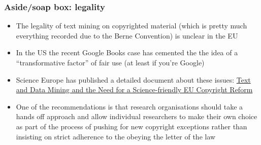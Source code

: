 \documentclass{beamer}
\begin{document}
\begin{frame}
\frametitle{Aside/soap box: legality}

\begin{itemize}
  \item The legality of text mining on copyrighted material (which is pretty
    much everything recorded due to the Berne Convention) is unclear in the
    EU\pause{}
  \item In the US the recent Google Books case has cemented the the idea of a
    ``transformative factor'' of fair use (at least if you're Google)\pause{}
  \item Science Europe has published a detailed document about these issues:
    \href{http://www.scienceeurope.org/uploads/PublicDocumentsAndSpeeches/WGs_docs/SE_Briefing_Paper_textand_Data_web.pdf}%
    {Text and Data Mining and the Need for a Science-friendly EU Copyright Reform}\pause{}
  \item One of the recommendations is that research organisations should take a
    hands off approach and allow individual researchers to make their own
    choice as part of the process of pushing for new copyright exceptions
    rather than insisting on strict adherence to the obeying the letter of the
    law
\end{itemize}

\end{frame}
\end{document}
